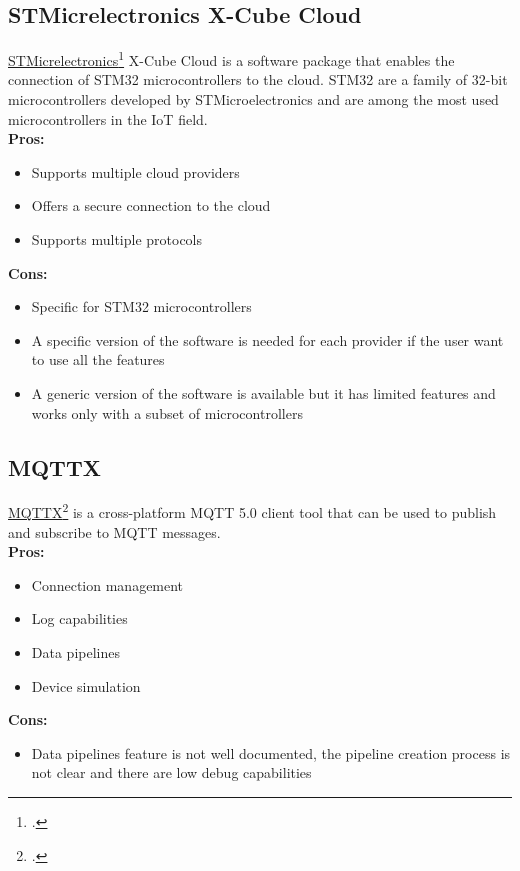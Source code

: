 \subsection{STMicrelectronics X-Cube Cloud}
\label{stm}
\href{https://www.st.com/}{STMicrelectronics}\footcite{site:st-micro} X-Cube Cloud is a software package that enables the connection of STM32 microcontrollers to the cloud. STM32 are a family of 32-bit microcontrollers developed by STMicroelectronics and are among the most used microcontrollers in the IoT field.\\
\textbf{Pros:}
\begin{itemize}
    \item Supports multiple cloud providers
    \item Offers a secure connection to the cloud
    \item Supports multiple protocols
\end{itemize}
\textbf{Cons:}
\begin{itemize}
    \item Specific for STM32 microcontrollers
    \item A specific version of the software is needed for each provider if the user want to use all the features 
    \item A generic version of the software is available but it has limited features and works only with a subset of microcontrollers
\end{itemize}

\subsection{MQTTX}
\label{mqttx}
\href{https://mqttx.app/}{MQTTX}\footcite{site:mqttx} is a cross-platform MQTT 5.0 client tool that can be used to publish and subscribe to MQTT messages.\\
\textbf{Pros:}
\begin{itemize}
    \item Connection management
    \item Log capabilities
    \item Data pipelines
    \item Device simulation
\end{itemize}
\textbf{Cons:}
\begin{itemize}
    \item Data pipelines feature is not well documented, the pipeline creation process is not clear and there are low debug capabilities
\end{itemize}

